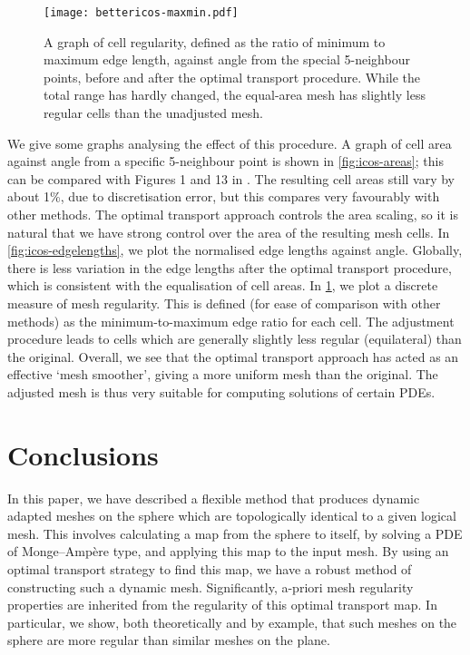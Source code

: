 \documentclass[11pt, a4paper]{scrartcl}  %
\theoremstyle{plain}
\theoremstyle{definition}
\numberwithin{equation}{section}
\begin{document}
\begin{figure}[!tb]
  \centering
  \texttt{[image: bettericos-maxmin.pdf]}
  \caption{A graph of cell regularity, defined as the ratio of minimum
to maximum edge length, against angle from the special 5-neighbour
points, before and after the optimal transport procedure. While the
total range has hardly changed, the equal-area mesh has slightly less
regular cells than the unadjusted mesh.}
\label{fig:icos-maxmin}
\end{figure}

We give some graphs analysing the effect of this procedure. A graph of
cell area against angle from a specific 5-neighbour point is shown in
\cref{fig:icos-areas}; this can be compared with Figures 1 and 13 in
\citet{iga2014improved}. The resulting cell areas still vary by about 1\%,
due to discretisation error, but this compares very favourably with
other methods. The optimal transport approach controls the area scaling,
so it is natural that we have strong control over the area of the
resulting mesh cells. In \cref{fig:icos-edgelengths}, we plot the
normalised edge lengths against angle. Globally, there is less variation
in the edge lengths after the optimal transport procedure, which is
consistent with the equalisation of cell areas. In \cref{fig:icos-maxmin},
we plot a discrete measure of mesh regularity. This is defined (for ease
of comparison with other methods) as the minimum-to-maximum edge ratio
for each cell. The adjustment procedure leads to cells which are
generally slightly less regular (equilateral) than the original.
Overall, we see that the optimal transport approach has acted as an
effective `mesh smoother', giving a more uniform mesh than the original.
The adjusted mesh is thus very suitable for computing solutions of
certain PDEs.

\section{Conclusions}
\label{sec:conc}

In this paper, we have described a flexible method that produces dynamic
adapted meshes on the sphere which are topologically identical to a
given logical mesh. This involves calculating a map from the sphere
to itself, by solving a PDE of Monge--Ampère type, and applying this map
to the input mesh. By using an optimal transport strategy to find this
map, we have a robust method of constructing such a dynamic mesh.
Significantly, a-priori mesh regularity properties are inherited from
the regularity of this optimal transport map. In particular, we show,
both theoretically and by example, that such meshes on the sphere are
more regular than similar meshes on the plane.
\end{document}
